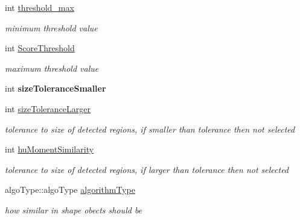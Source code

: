 \begin{DoxyCompactItemize}
int \hyperlink{struct_settings_values_a2d338baea9c8dba546dc265649a81689}{threshold\+\_\+max}
\begin{DoxyCompactList}\small\item\em minimum threshold value \end{DoxyCompactList}\item 
\mbox{\label{struct_settings_values_a41cb832a5aa92eae047bf29e2f498c1c}} 
int \hyperlink{struct_settings_values_a41cb832a5aa92eae047bf29e2f498c1c}{Score\+Threshold}
\begin{DoxyCompactList}\small\item\em maximum threshold value \end{DoxyCompactList}\item 
\mbox{\label{struct_settings_values_a1a49689492e105d90562e1008a549f09}} 
int {\bfseries size\+Tolerance\+Smaller}
\item 
\mbox{\label{struct_settings_values_a57b7fe23d3c419fdff5fdc8504542d8f}} 
int \hyperlink{struct_settings_values_a57b7fe23d3c419fdff5fdc8504542d8f}{size\+Tolerance\+Larger}
\begin{DoxyCompactList}\small\item\em tolerance to size of detected regions, if smaller than tolerance then not selected \end{DoxyCompactList}\item 
\mbox{\label{struct_settings_values_a9cf36ccdbc5b9a17056b5ead4b847a0a}} 
int \hyperlink{struct_settings_values_a9cf36ccdbc5b9a17056b5ead4b847a0a}{hu\+Moment\+Similarity}
\begin{DoxyCompactList}\small\item\em tolerance to size of detected regions, if larger than tolerance then not selected \end{DoxyCompactList}\item 
\mbox{\label{struct_settings_values_ad067123d5f5095c6986733fd31e4f270}} 
algo\+Type\+::algo\+Type \hyperlink{struct_settings_values_ad067123d5f5095c6986733fd31e4f270}{algorithm\+Type}
\begin{DoxyCompactList}\small\item\em how similar in shape obects should be \end{DoxyCompactList}\end{DoxyCompactItemize}


